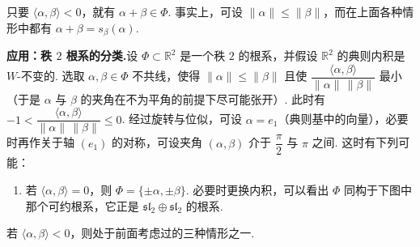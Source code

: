 \begin{remark*}
只要 $\langle\alpha,\beta\rangle<0$，就有 $\alpha+\beta\in\Phi$. 事实上，可设 $\lVert\alpha\rVert\leqslant\lVert\beta\rVert$，而在上面各种情形中都有 $\alpha+\beta=s_{\beta}(\alpha)$.
\end{remark*}
\textbf{应用：秩 $2$ 根系的分类.}\quad 设 $\Phi\subset\mathbb{R}^2$ 是一个秩 $2$ 的根系，并假设 $\mathbb{R}^2$ 的典则内积是 $W$-不变的. 选取 $\alpha,\beta\in\Phi$ 不共线，使得 $\lVert\alpha\rVert\leqslant\lVert\beta\rVert$ 且使 $\dfrac{\langle\alpha,\beta\rangle}{\lVert\alpha\rVert\,\lVert\beta\rVert}$ 最小（于是 $\alpha$ 与 $\beta$ 的夹角在不为平角的前提下尽可能张开）. 此时有 $-1<\dfrac{\langle\alpha,\beta\rangle}{\lVert\alpha\rVert\,\lVert\beta\rVert}\leqslant 0$. 经过旋转与位似，可设 $\alpha=e_1$（典则基中的向量），必要时再作关于轴 $(e_1)$ 的对称，可设夹角 $(\alpha,\beta)$ 介于 $\dfrac{\pi}{2}$ 与 $\pi$ 之间. 这时有下列可能：
\begin{enumerate}[label=\roman*)]
\item 若 $\langle\alpha,\beta\rangle=0$，则 $\Phi=\{\pm\alpha,\pm\beta\}$. 必要时更换内积，可以看出 $\Phi$ 同构于下图中那个可约根系，它正是 $\mathfrak{sl}_2\oplus\mathfrak{sl}_2$ 的根系.
\begin{center}
\end{center}
\end{enumerate}
若 $\langle\alpha,\beta\rangle<0$，则处于前面考虑过的三种情形之一.
